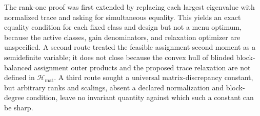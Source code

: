 The rank-one proof was first extended by replacing each largest eigenvalue with normalized trace and asking for simultaneous equality.  This yields an exact equality condition for each fixed class and design but not a menu optimum, because the active classes, gain denominators, and relaxation optimizer are unspecified.  A second route treated the feasible assignment second moment as a semidefinite variable; it does not close because the convex hull of blinded block-balanced assignment outer products and the proposed trace relaxation are not defined in \(\mathcal H_{\mathrm{mat}}\).  A third route sought a universal matrix-discrepancy constant, but arbitrary ranks and scalings, absent a declared normalization and block-degree condition, leave no invariant quantity against which such a constant can be sharp.